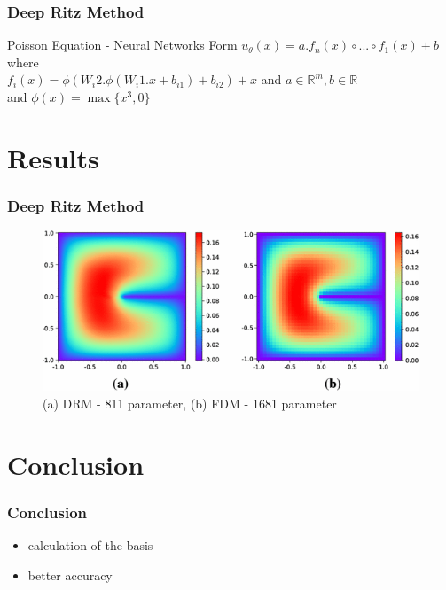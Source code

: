 \documentclass{beamer}
\newcommand{\R}{\mathbb{R}}
\begin{document}
\begin{frame}
	\frametitle{Deep Ritz Method}
	
	\begin{block}{Poisson Equation - Neural Networks Form}
	$u_{\theta}(x) = a . f_{n}(x) \circ ... \circ f_{1}(x) +b$ \\
	where \\
	$f_{i}(x) = \phi(W_i2 . \phi(W_i1 . x + b_{i1}) + b_{i2}) + x $ and $a \in \R^m, b\in\R $ \\
	and $\phi(x) = \max\{x^3,0\}$
	\end{block}	
\end{frame}




\section{Results}

\begin{frame}
	\frametitle{Deep Ritz Method}
	\begin{figure}
		\caption{(a) DRM - 811 parameter, (b) FDM - 1681 parameter}
		\includegraphics[width=\textwidth,height=\textheight,keepaspectratio]{DRMvsFDM.png}

	\end{figure}
\end{frame}


\section{Conclusion}
\begin{frame}
	\frametitle{Conclusion}
	\begin{itemize}
		\item <1- > calculation of the basis
		\item <2- > better accuracy
	\end{itemize}
\end{frame}
\end{document}
